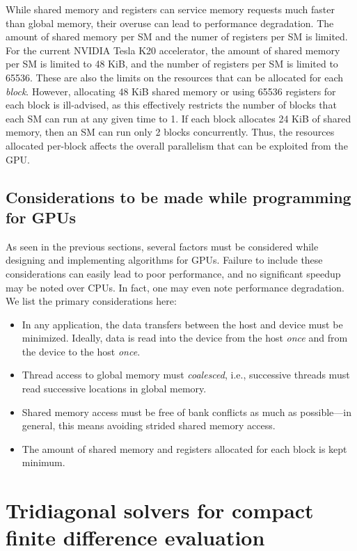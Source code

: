 While shared memory and registers can service memory requests
much faster than global memory,
their overuse can lead to performance degradation.
The amount of shared memory per SM
and the numer of registers per SM is limited.
For the current NVIDIA Tesla K20 accelerator,
the amount of shared memory per SM is limited to 48 KiB,
and the number of registers per SM is limited to 65536.
These are also the limits
on the resources that can be allocated for each \emph{block}.
However,
allocating 48 KiB shared memory or using 65536 registers 
for each block is ill-advised,
as this effectively restricts the number of blocks that
each SM can run at any given time to 1.
If each block allocates 24 KiB of shared memory,
then an SM can run only 2 blocks concurrently.
Thus, the resources allocated per-block affects
the overall parallelism that can be exploited from the GPU.

\subsection{Considerations to be made while programming for GPUs}

As seen in the previous sections,
several factors must be considered while
designing and implementing algorithms for GPUs.
Failure to include these considerations can easily
lead to poor performance,
and no significant speedup may be noted over CPUs.
In fact, one may even note performance degradation.
We list the primary considerations here:

\begin{itemize}
    \item In any application, the data transfers between
        the host and device must be minimized.
        Ideally,
        data is read into the device from the host \emph{once}
        and from the device to the host \emph{once}.
    \item Thread access to global memory must \emph{coalesced},
        i.e., successive threads must read successive locations
        in global memory.
    \item Shared memory access must be free of bank conflicts
        as much as possible---in general, this means avoiding
        strided shared memory access.
    \item The amount of shared memory and registers
        allocated for each block is kept minimum.
\end{itemize}

\section{Tridiagonal solvers for compact finite difference evaluation}

